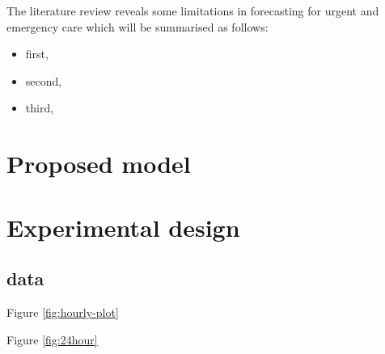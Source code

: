 \documentclass[]{elsarticle} %
\providecommand{\tightlist}{%
  \setlength{\itemsep}{0pt}\setlength{\parskip}{0pt}}
\begin{document}
The literature review reveals some limitations in forecasting for urgent and emergency care which will be summarised as follows:

\begin{itemize}
\tightlist
\item
  first,
\item
  second,
\item
  third,
\end{itemize}

\hypertarget{model}{%
\section{Proposed model}\label{model}}

\hypertarget{design}{%
\section{Experimental design}\label{design}}

\hypertarget{data}{%
\subsection{data}\label{data}}

Figure \ref{fig:hourly-plot}

Figure \ref{fig:24hour}
\end{document}
